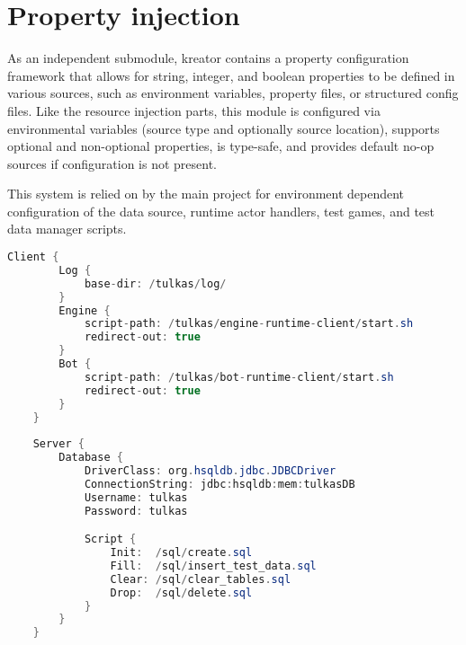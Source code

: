 	
	
	\section{Property injection}
	
	As an independent submodule, kreator contains a property configuration framework that allows for string, integer, and boolean properties to be defined in various sources, such as environment variables, property files, or structured config files. Like the resource injection parts, this module is configured via environmental variables (source type and optionally source location), supports optional and non-optional properties, is type-safe, and provides default no-op sources if configuration is not present.
	
	This system is relied on by the main project for environment dependent configuration of the data source, runtime actor handlers, test games, and test data manager scripts.
	
		\begin{center}
			\begin{minipage}{12cm}
		\begin{lstlisting}[language=Java, title={\emph{Sample config} -- \code{tulkas.conf}}]
	Client {
		Log {
			base-dir: /tulkas/log/
		}
		Engine {
        	script-path: /tulkas/engine-runtime-client/start.sh
        	redirect-out: true
		}
		Bot {
        	script-path: /tulkas/bot-runtime-client/start.sh
        	redirect-out: true
    	}
	}
	
	Server {
		Database {
        	DriverClass: org.hsqldb.jdbc.JDBCDriver
        	ConnectionString: jdbc:hsqldb:mem:tulkasDB
        	Username: tulkas
        	Password: tulkas

        	Script {
            	Init:  /sql/create.sql
            	Fill:  /sql/insert_test_data.sql
            	Clear: /sql/clear_tables.sql
            	Drop:  /sql/delete.sql
        	}
    	}
	}
		\end{lstlisting}
			\end{minipage}
		\end{center}
		
